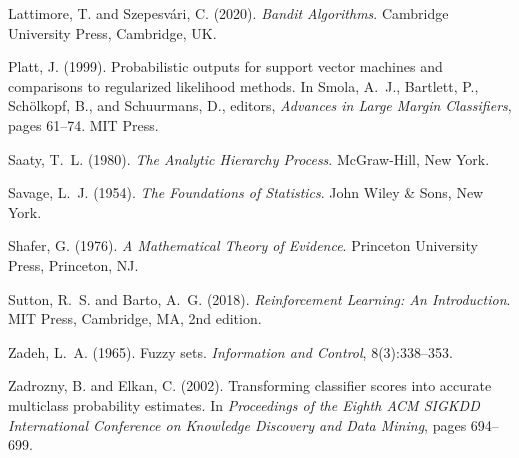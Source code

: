 \documentclass[12pt,a4paper]{article}
\begin{document}
\begin{thebibliography}{99}
Lattimore, T. and Szepesvári, C. (2020).
\newblock \emph{Bandit Algorithms}.
\newblock Cambridge University Press, Cambridge, UK.

Platt, J. (1999).
\newblock Probabilistic outputs for support vector machines and comparisons to regularized likelihood methods.
\newblock In Smola, A.~J., Bartlett, P., Schölkopf, B., and Schuurmans, D., editors, \emph{Advances in Large Margin Classifiers}, pages 61--74. MIT Press.

Saaty, T.~L. (1980).
\newblock \emph{The Analytic Hierarchy Process}.
\newblock McGraw-Hill, New York.

Savage, L.~J. (1954).
\newblock \emph{The Foundations of Statistics}.
\newblock John Wiley \& Sons, New York.

Shafer, G. (1976).
\newblock \emph{A Mathematical Theory of Evidence}.
\newblock Princeton University Press, Princeton, NJ.

Sutton, R.~S. and Barto, A.~G. (2018).
\newblock \emph{Reinforcement Learning: An Introduction}.
\newblock MIT Press, Cambridge, MA, 2nd edition.

Zadeh, L.~A. (1965).
\newblock Fuzzy sets.
\newblock \emph{Information and Control}, 8(3):338--353.

Zadrozny, B. and Elkan, C. (2002).
\newblock Transforming classifier scores into accurate multiclass probability estimates.
\newblock In \emph{Proceedings of the Eighth ACM SIGKDD International Conference on Knowledge Discovery and Data Mining}, pages 694--699.

\end{thebibliography}
\end{document}
